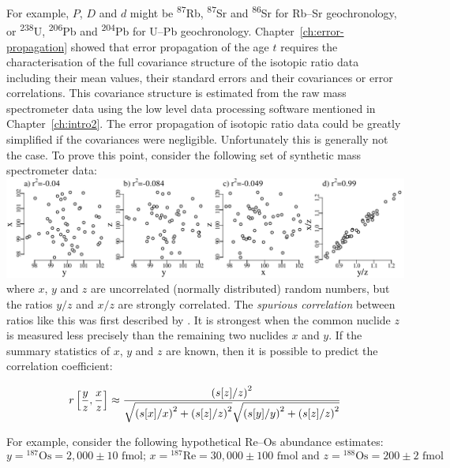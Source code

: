 \begin{refsection}
For example, $P$, $D$ and $d$ might be \textsuperscript{87}Rb,
\textsuperscript{87}Sr and \textsuperscript{86}Sr for Rb--Sr
geochronology, or \textsuperscript{238}U, \textsuperscript{206}Pb and
\textsuperscript{204}Pb for U--Pb
geochronology. Chapter~\ref{ch:error-propagation} showed that error
propagation of the age $t$ requires the characterisation of the full
covariance structure of the isotopic ratio data including their mean
values, their standard errors and their covariances or error
correlations. This covariance structure is estimated from the raw mass
spectrometer data using the low level data processing software
mentioned in Chapter~\ref{ch:intro2}.  The error propagation of
isotopic ratio data could be greatly simplified if the covariances
were negligible. Unfortunately this is generally not the case.  To
prove this point, consider the following set of synthetic mass
spectrometer data:\\

\noindent\includegraphics[width=\textwidth]{../figures/spurious}\\

\noindent where $x$, $y$ and $z$ are uncorrelated (normally
distributed) random numbers, but the ratios $y/z$ and $x/z$ are
strongly correlated. The \emph{spurious correlation} between ratios
like this was first described by \citet{pearson1896}. It is strongest
when the common nuclide $z$ is measured less precisely than the
remaining two nuclides $x$ and $y$. If the summary statistics of $x$,
$y$ and $z$ are known, then it is possible to predict the correlation
coefficient:

\begin{equation}
  \noindent r\left[\frac{y}{z},\frac{x}{z}\right] \approx
  \frac{
    \left({s[z]}/{z}\right)^2
  }{
    \sqrt{\left({s[x]}/{x}\right)^2 +
      \left({s[z]}/{z}\right)^2}
    \sqrt{\left({s[y]}/{y}\right)^2 +
      \left({s[z]}/{z}\right)^2}
  }
  \label{eq:spurious-conventional}
\end{equation}

For example, consider the following hypothetical Re--Os abundance
estimates:
\[
y = {}^{187}\mbox{Os} = 2,000 \pm 10 \mbox{~fmol;~}
x = {}^{187}\mbox{Re} = 30,000 \pm 100 \mbox{~fmol}
\mbox{~and~}
z = {}^{188}\mbox{Os} = 200 \pm 2 \mbox{~fmol}
\]


\end{refsection}

